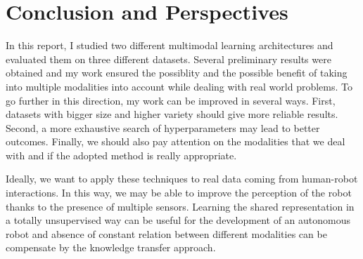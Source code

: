 \section{Conclusion and Perspectives} \label{section:conclusion}

In this report, I studied two different multimodal learning
architectures and evaluated them on three different datasets.
Several preliminary results were obtained and my work ensured the
possiblity and the possible benefit of taking into multiple modalities
into account while dealing with real world problems.
To go further in this direction, my work can be improved in several ways.
First, datasets with bigger size and higher variety should give more
reliable results.
Second, a more exhaustive search of hyperparameters may lead to better
outcomes. Finally, we should also pay attention on the modalities
that we deal with and if the adopted method is really appropriate.

Ideally, we want to apply these techniques to real
data coming from human-robot interactions. In this way, we may be able to
improve the perception of the robot thanks to the presence of
multiple sensors. Learning the shared representation in a totally
unsupervised way can be useful for the development of an autonomous
robot and absence of constant relation between different modalities
can be compensate by the knowledge transfer approach.
